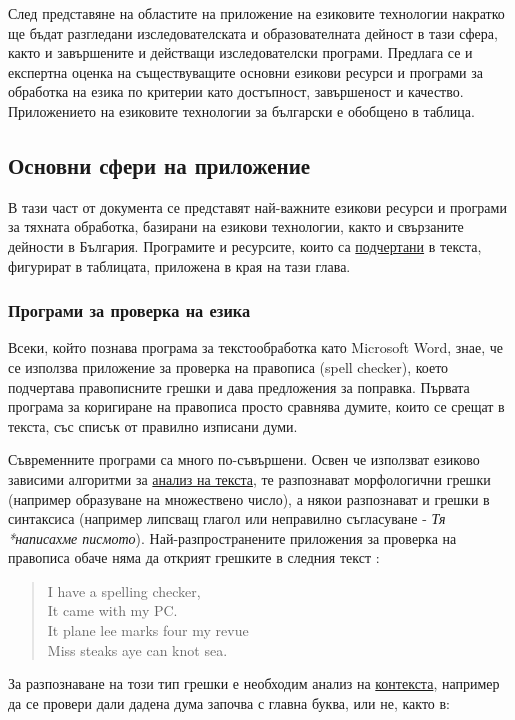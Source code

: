 \documentclass[]{../../metanetpaper}
\begin{document}
\begin{multicols}{2}
След представяне на областите на приложение на езиковите технологии накратко ще бъдат разгледани изследователската и образователната дейност в тази сфера, както и завършените и действащи изследователски програми. Предлага се  и експертна оценка на съществуващите основни езикови ресурси и програми за обработка на езика по критерии като достъпност, завършеност и качество. Приложението на езиковите технологии за български е обобщено в таблица.

\subsection{Основни сфери на приложение}

В тази част от документа се представят най-важните езикови ресурси и програми за тяхната обработка, базирани на езикови технологии, както и свързаните дейности в България. Програмите и ресурсите, които са \uline{подчертани} в текста, фигурират в таблицата, приложена в края на тази глава.  

\subsubsection{Програми за проверка на езика}

Всеки, който познава програма за текстообработка като Microsoft Word, знае, че се използва приложение за проверка на правописа (spell checker), което подчертава правописните грешки и дава предложения за поправка. Първата програма за коригиране на правописа просто сравнява думите, които се срещат в текста, със списък от правилно изписани думи. 

Съвременните програми са много по-съвършени. Освен че използват
езиково зависими алгоритми за \uline{анализ на текста}, те разпознават
морфологични грешки (например образуване на множествено число), а
някои разпознават и грешки в синтаксиса (например липсващ глагол или
неправилно съгласуване - {\it Тя *написахме
  писмото}). Най-разпространените приложения за проверка на правописа
обаче няма да открият грешките в следния текст \cite{zar1}: 

\begin{quote}
  I have a spelling checker,\\
  It came with my PC.\\
  It plane lee marks four my revue\\
  Miss steaks aye can knot sea.
\end{quote}

За разпознаване на този тип грешки е необходим анализ на \uline{контекста}, например да се провери дали дадена дума започва с главна буква, или не, както в: 


\end{multicols}
\end{document}
